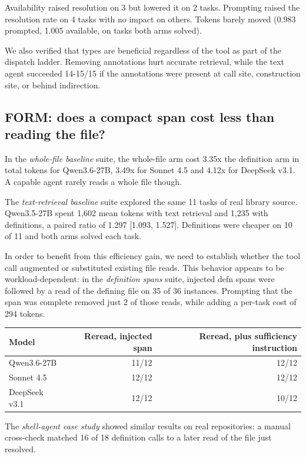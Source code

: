 \documentclass[
]{article}
\newcounter{none} %
\begin{document}
Availability raised resolution on 3 but lowered it on 2 tasks. Prompting
raised the resolution rate on 4 tasks with no impact on others. Tokens
barely moved (0.983 prompted, 1.005 available, on tasks both arms
solved).

We also verified that types are beneficial regardless of the tool as
part of the dispatch ladder. Removing annotations hurt accurate
retrieval, while the text agent succeeded 14-15/15 if the annotations
were present at call site, construction site, or behind indirection.

\subsection{FORM: does a compact span cost less than reading the
file?}\label{form-does-a-compact-span-cost-less-than-reading-the-file}

In the \emph{whole-file baseline} suite, the whole-file arm cost 3.35x
the definition arm in total tokens for Qwen3.6-27B, 3.49x for Sonnet 4.5
and 4.12x for DeepSeek v3.1. A capable agent rarely reads a whole file
though.

The \emph{text-retrieval baseline} suite explored the same 11 tasks of
real library source. Qwen3.5-27B spent 1,602 mean tokens with text
retrieval and 1,235 with definitions, a paired ratio of 1.297 {[}1.093,
1.527{]}. Definitions were cheaper on 10 of 11 and both arms solved each
task.

In order to benefit from this efficiency gain, we need to establish
whether the tool call augmented or substituted existing file reads. This
behavior appears to be workload-dependent: in the \emph{definition
spans} suite, injected defn spans were followed by a read of the
defining file on 35 of 36 instances. Prompting that the span was
complete removed just 2 of those reads, while adding a per-task cost of
294 tokens.

{\def\LTcaptype{none} %
\begin{longtable}[]{@{}lrr@{}}
\toprule\noalign{}
Model & Reread, injected span & Reread, plus sufficiency instruction \\
\midrule\noalign{}
\endhead
\bottomrule\noalign{}
\endlastfoot
Qwen3.6-27B & 11/12 & 12/12 \\
Sonnet 4.5 & 12/12 & 12/12 \\
DeepSeek v3.1 & 12/12 & 10/12 \\
\end{longtable}
}

The \emph{shell-agent case study} showed similar results on real
repositories: a manual cross-check matched 16 of 18 definition calls to
a later read of the file just resolved.
\end{document}
